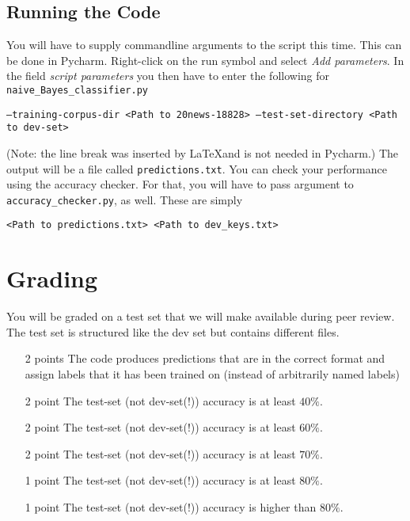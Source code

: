 \documentclass[11pt, leqno, a4paper]{article}
\begin{document}
\subsection{Running the Code}
You will have to supply commandline arguments to the script this time. This can be done in Pycharm. 
Right-click on the run symbol and select \textit{Add parameters}. In the field \textit{script parameters}
you then have to enter the following for \texttt{naive\_Bayes\_classifier.py}
\begin{center}
\texttt{--training-corpus-dir <Path to 20news-18828> --test-set-directory <Path to dev-set>}
\end{center}
(Note: the line break was inserted by \LaTeX and is not needed in Pycharm.)
The output will be a file called \texttt{predictions.txt}. You can check your performance using the
accuracy checker. For that, you will have to pass argument to \texttt{accuracy\_checker.py}, as well. These
are simply
\begin{center}
\texttt{<Path to predictions.txt> <Path to dev\_keys.txt>}
\end{center} 

\section{Grading}
You will be graded on a test set that we will make available during peer review. The test set
is structured like the dev set but contains different files.
\begin{itemize}
\item[2 points] The code produces predictions that are in the correct format and assign labels that
it has been trained on (instead of arbitrarily named labels)
\item[2 point] The test-set (not dev-set(!)) accuracy is at least $ 40\% $.
\item[2 point] The test-set (not dev-set(!)) accuracy is at least $ 60\% $.
\item[2 point] The test-set (not dev-set(!)) accuracy is at least $ 70\% $.
\item[1 point] The test-set (not dev-set(!)) accuracy is at least $ 80\% $.
\item[1 point] The test-set (not dev-set(!)) accuracy is higher than $ 80\% $.
\end{itemize}
\end{document}
